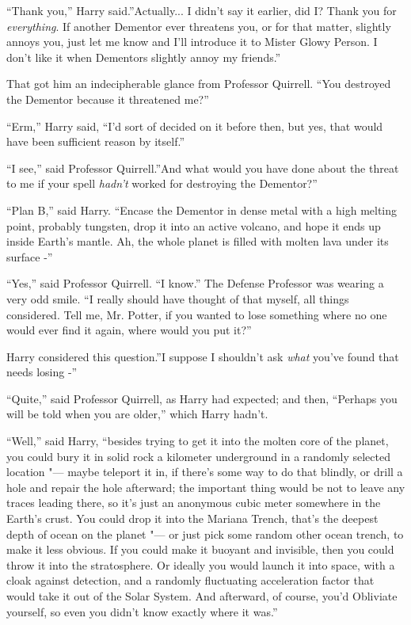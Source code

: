 ``Thank you,'' Harry said.''Actually... I didn't say it earlier,
did I? Thank you for \emph{everything}. If another Dementor ever
threatens you, or for that matter, slightly annoys you, just let me know
and I'll introduce it to Mister Glowy Person. I don't like it when
Dementors slightly annoy my friends.''

That got him an indecipherable glance from Professor Quirrell. ``You
destroyed the Dementor because it threatened me?''

``Erm,'' Harry said, ``I'd sort of decided on it before then, but yes,
that would have been sufficient reason by itself.''

``I see,'' said Professor Quirrell.''And what would you have done about
the threat to me if your spell \emph{hadn't} worked for destroying the
Dementor?''

``Plan B,'' said Harry. ``Encase the Dementor in dense metal with a high
melting point, probably tungsten, drop it into an active volcano, and
hope it ends up inside Earth's mantle. Ah, the whole planet is filled
with molten lava under its surface -''

``Yes,'' said Professor Quirrell. ``I know.'' The Defense Professor was
wearing a very odd smile. ``I really should have thought of that myself,
all things considered. Tell me, Mr. Potter, if you wanted to lose
something where no one would ever find it again, where would you put
it?''

Harry considered this question.''I suppose I shouldn't ask \emph{what}
you've found that needs losing -''

``Quite,'' said Professor Quirrell, as Harry had expected; and then,
``Perhaps you will be told when you are older,'' which Harry hadn't.

``Well,'' said Harry, ``besides trying to get it into the molten core of
the planet, you could bury it in solid rock a kilometer underground in a
randomly selected location "--- maybe teleport it in, if there's some way
to do that blindly, or drill a hole and repair the hole afterward; the
important thing would be not to leave any traces leading there, so it's
just an anonymous cubic meter somewhere in the Earth's crust. You could
drop it into the Mariana Trench, that's the deepest depth of ocean on
the planet "--- or just pick some random other ocean trench, to make it
less obvious. If you could make it buoyant and invisible, then you could
throw it into the stratosphere. Or ideally you would launch it into
space, with a cloak against detection, and a randomly fluctuating
acceleration factor that would take it out of the Solar System. And
afterward, of course, you'd Obliviate yourself, so even you didn't know
exactly where it was.''

